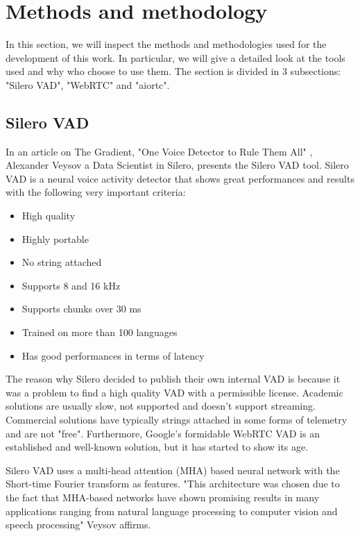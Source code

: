 \documentclass[../main.tex]{subfiles}
\begin{document}
\section{Methods and methodology}
\label{methods and methodology}

In this section, we will inspect the methods and methodologies used for the development of this work. In particular, we will give a detailed look at the tools used and why who choose to use them. The section is divided in 3 subsections: "Silero VAD", "WebRTC" and "aiortc". 

\subsection{Silero VAD}

In an article on The Gradient, "One Voice Detector to Rule Them All" \cite{veysov20202onevoice}, Alexander Veysov a Data Scientist in Silero, presents the Silero VAD tool. Silero VAD is a neural voice activity detector that shows great performances and results with the following very important criteria:

\begin{itemize}
    \item High quality
    \item Highly portable
    \item No string attached
    \item Supports 8 and 16 kHz
    \item Supports chunks over 30 ms
    \item Trained on more than 100 languages 
    \item Has good performances in terms of latency
\end{itemize}

The reason why Silero decided to publish their own internal VAD is because it was a problem to find a high quality VAD with a permissible license. Academic solutions are usually slow, not supported and doesn't support streaming. Commercial solutions have typically strings attached in some forms of telemetry and are not "free". Furthermore, Google’s formidable WebRTC VAD is an established and well-known solution, but it has started to show its age. 

Silero VAD uses a multi-head attention (MHA) based neural network with the Short-time Fourier transform as features. "This architecture was chosen due to the fact that MHA-based networks have shown promising results in many applications ranging from natural language processing to computer vision and speech processing" Veysov affirms. 
\end{document}
